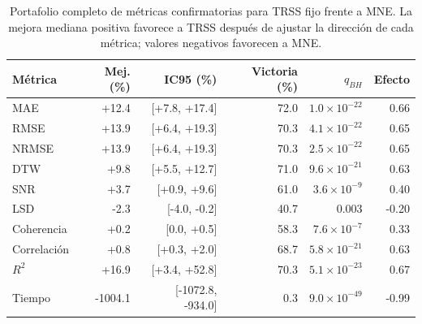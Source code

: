 \begin{table}[htbp]
\centering
\footnotesize
\caption{Portafolio completo de métricas confirmatorias para TRSS fijo frente a MNE. La mejora mediana positiva favorece a TRSS después de ajustar la dirección de cada métrica; valores negativos favorecen a MNE.}
\label{tab:ch6_metric_portfolio}
\begin{tabular}{@{}lrrrrr@{}}
\toprule
Métrica & Mej. (\%) & IC95 (\%) & Victoria (\%) & $q_{BH}$ & Efecto \\
\midrule
MAE & +12.4 & [+7.8, +17.4] & 72.0 & $1.0\times 10^{-22}$ & 0.66 \\
RMSE & +13.9 & [+6.4, +19.3] & 70.3 & $4.1\times 10^{-22}$ & 0.65 \\
NRMSE & +13.9 & [+6.4, +19.3] & 70.3 & $2.5\times 10^{-22}$ & 0.65 \\
DTW & +9.8 & [+5.5, +12.7] & 71.0 & $9.6\times 10^{-21}$ & 0.63 \\
SNR & +3.7 & [+0.9, +9.6] & 61.0 & $3.6\times 10^{-9}$ & 0.40 \\
LSD & -2.3 & [-4.0, -0.2] & 40.7 & 0.003 & -0.20 \\
Coherencia & +0.2 & [0.0, +0.5] & 58.3 & $7.6\times 10^{-7}$ & 0.33 \\
Correlación & +0.8 & [+0.3, +2.0] & 68.7 & $5.8\times 10^{-21}$ & 0.63 \\
$R^2$ & +16.9 & [+3.4, +52.8] & 70.3 & $5.1\times 10^{-23}$ & 0.67 \\
Tiempo & -1004.1 & [-1072.8, -934.0] & 0.3 & $9.0\times 10^{-49}$ & -0.99 \\
\bottomrule
\end{tabular}
\end{table}
